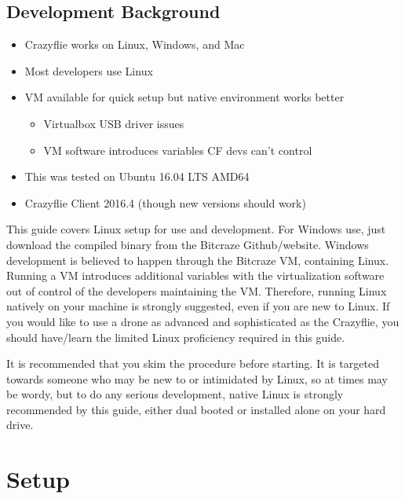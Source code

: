 \documentclass[12pt]{article}
\begin{document}
\subsection{Development Background}
	\begin{itemize}
		\item{Crazyflie works on Linux, Windows, and Mac}
		\item{Most developers use Linux}
		\item VM available for quick setup but native environment works better
			\begin{itemize}
				\item Virtualbox USB driver issues
				\item VM software introduces variables CF devs can't control
			\end{itemize}
		\item{This was tested on Ubuntu 16.04 LTS AMD64}
		\item Crazyflie Client 2016.4 (though new versions should work)
	\end{itemize}
This guide covers Linux setup for use and development. For Windows use, just download the compiled binary from the Bitcraze Github/website. Windows development is believed to happen through the Bitcraze VM, containing Linux. Running a VM introduces additional variables with the virtualization software out of control of the developers maintaining the VM. Therefore, running Linux natively on your machine is strongly suggested, even if you are new to Linux. If you would like to use a drone as advanced and sophisticated as the Crazyflie, you should have/learn the limited Linux proficiency required in this guide. 

It is recommended that you skim the procedure before starting. It is targeted towards someone who may be new to or intimidated by Linux, so at times may be wordy, but to do any serious development, native Linux is strongly recommended by this guide, either dual booted or installed alone on your hard drive. 
\section{Setup}
\end{document}
